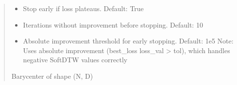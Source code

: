 \documentclass[letterpaper,10pt,english]{sphinxmanual}
\begin{document}
\begin{fulllineitems}
\begin{quote}
\begin{description}
\begin{itemize}
\item {} 
\sphinxAtStartPar
{} \textendash{} Stop early if loss plateaus. Default: True

\item {} 
\sphinxAtStartPar
{} \textendash{} Iterations without improvement before stopping. Default: 10

\item {} 
\sphinxAtStartPar
{} \textendash{} Absolute improvement threshold for early stopping. Default: 1e\sphinxhyphen{}5
Note: Uses absolute improvement (best\_loss \sphinxhyphen{} loss\_val \textgreater{} tol), which handles
negative SoftDTW values correctly

\end{itemize}

\sphinxAtStartPar
Barycenter of shape (N, D)

\end{description}\end{quote}

\end{fulllineitems}

\end{document}
